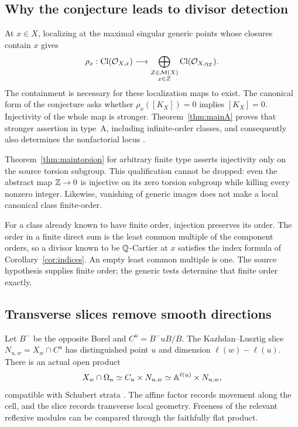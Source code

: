 \subsection{Why the conjecture leads to divisor detection}
At $x\in X$, localizing at the maximal singular generic points whose closures contain $x$ gives
\begin{equation}\label{eq:survey-rho}
 \rho_x:\operatorname{Cl}(\mathcal O_{X,x})\longrightarrow
 \bigoplus_{\substack{Z\in\mathcal M(X)\\x\in Z}}\operatorname{Cl}(\mathcal O_{X,\eta_Z}).
\end{equation}
The containment is necessary for these localization maps to exist. The canonical form of the conjecture asks whether $\rho_x([K_X])=0$ implies $[K_X]=0$. Injectivity of the whole map is stronger. Theorem~\ref{thm:mainA} proves that stronger assertion in type~A, including infinite-order classes, and consequently also determines the nonfactorial locus \cite[Conjecture~6.14]{WY08}\cite[Conjecture~7.39]{WY23}.

Theorem~\ref{thm:maintorsion} for arbitrary finite type asserts injectivity only on the source torsion subgroup. This qualification cannot be dropped: even the abstract map $\mathbb Z\to0$ is injective on its zero torsion subgroup while killing every nonzero integer. Likewise, vanishing of generic images does not make a local canonical class finite-order.

For a class already known to have finite order, injection preserves its order. The order in a finite direct sum is the least common multiple of the component orders, so a divisor known to be $\mathbb Q$-Cartier at $x$ satisfies the index formula of Corollary~\ref{cor:indices}. An empty least common multiple is one. The source hypothesis supplies finite order; the generic tests determine that finite order exactly.

\subsection{Transverse slices remove smooth directions}
Let $B^-$ be the opposite Borel and $C^u=B^-uB/B$. The Kazhdan--Lusztig slice $N_{u,w}=X_w\cap C^u$ has distinguished point $u$ and dimension $\ell(w)-\ell(u)$. There is an actual open product
\[
 X_w\cap\Omega_u\simeq C_u\times N_{u,w}
 \simeq\mathbb A^{\ell(u)}\times N_{u,w},
\]
compatible with Schubert strata \cite[Lemma~3.2]{WY08}\cite[Lemma~2.1]{KWY13}. The affine factor records movement along the cell, and the slice records transverse local geometry. Freeness of the relevant reflexive modules can be compared through the faithfully flat product.

